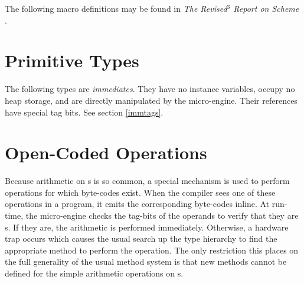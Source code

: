 



The following macro definitions may be found in \emph{The Revised$^3$
Report on Scheme} \cite{R3RS}.



\section{Primitive Types}

The following types are \emph{immediates}.  They have no instance
variables, occupy no heap storage, and are directly manipulated by the
micro-engine.  Their references have special tag bits.  See section
\ref{immtags}.



\section{Open-Coded Operations}

Because arithmetic on s is so common, a special mechanism
is used to perform operations for which byte-codes exist.  When the
compiler sees one of these operations in a program, it emits the
corresponding byte-codes inline. At run-time, the micro-engine checks
the tag-bits of the operands to verify that they are s.  If
they are, the arithmetic is performed immediately.  Otherwise, a
hardware trap occurs which causes the usual search up the type
hierarchy to find the appropriate method to perform the operation.
The only restriction this places on the full generality of the usual
method system is that new methods cannot be defined for the simple
arithmetic operations on s.


